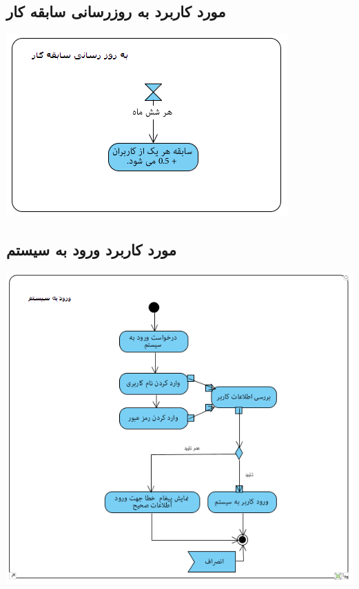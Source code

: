 \documentclass{article}
\begin{document}
\newpage
\vspace{2cm}
\subsection*{مورد کاربرد به روزرسانی سابقه کار}
\vspace{2cm}
\begin{center}
\includegraphics[width=\textwidth]{ActivityDiagrams/9.png}
\end{center}

\newpage
\vspace{2cm}
\subsection*{مورد کاربرد ورود به سیستم}
\vspace{2cm}
\begin{center}
\includegraphics[width=\textwidth]{ActivityDiagrams/10.png}
\end{center}
\end{document}
